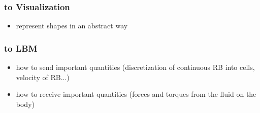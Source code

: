 \subsubsection{to Visualization}
\begin{itemize}
\item represent shapes in an abstract way
\end{itemize}
\subsubsection{to LBM}
\begin{itemize}
\item how to send important quantities (discretization of continuous RB into cells, velocity of RB...)
\item how to receive important quantities (forces and torques from the fluid on the body)
\end{itemize}